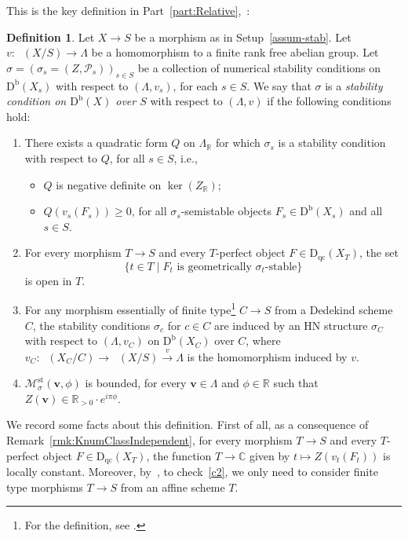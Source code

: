 \documentclass[11pt, reqno]{amsart}
\numberwithin{equation}{section}
\theoremstyle{plain}
\theoremstyle{remark}
\theoremstyle{definition}
\newtheorem{definition}[theorem]{Definition}
\theoremstyle{italicsname}
\newcommand{\st}{\mid}
\newcommand{\bv}{\mathbf{v}}
\newcommand{\Db}{\mathrm{D^b}}
\newcommand{\Dqc}{\mathrm{D}_{\mathrm{qc}}}
\newcommand{\num}{\mathrm{num}}
\DeclareMathOperator{\Knum}{\rK_{\num}}
\newcommand{\cM}{\mathcal{M}}
\newcommand{\cP}{\mathscr{P}}
\newcommand{\rK}{\mathrm{K}}
\def\CC{\ensuremath{\mathbb{C}}}
\def\RR{\ensuremath{\mathbb{R}}}
\begin{document}
This is the key definition in Part~\ref{part:Relative},~\cite[Definition 21.15]{stability-families}:

\begin{definition}\label{def:FamilyStabilityConditions}
Let $X\to S$ be a morphism as in Setup~\ref{assum-stab}. 
Let $v\colon\Knum(X/S)\to\Lambda$ be a homomorphism to a finite rank free abelian group. 
Let ${\sigma}=(\sigma_s=(Z,\cP_s))_{s\in S}$ be a collection of numerical stability conditions on $\Db(X_s)$ with respect to $(\Lambda,v_s)$, for each $s\in S$. 
We say that ${\sigma}$ is a \emph{stability condition on $\Db(X)$ over $S$} with respect to $(\Lambda,v)$ if the following conditions hold:
\begin{enumerate}[{\rm (i)}]
\item\label{c1} There exists a quadratic form $Q$ on $\Lambda_\RR$ for which $\sigma_s$ is a stability condition with respect to $Q$, for all $s\in S$, i.e.,
\begin{itemize}
    \item $Q$ is negative definite on $\ker(Z_\RR)$;
    \item $Q(v_s(F_s))\geq0$, for all $\sigma_s$-semistable objects $F_s\in\Db(X_s)$ and all $s\in S$.
\end{itemize}
\item\label{c2} For every morphism $T\to S$ and every $T$-perfect object $F\in \Dqc(X_T)$, the set 
\[
\{t\in T \st F_t \text{ is geometrically }\sigma_t\text{-stable}\}
\]
is open in $T$.
\item\label{c3} For any morphism essentially of finite type\footnote{For the definition, see \cite[Definition 11.16]{stability-families}.}  $C\to S$ from a Dedekind scheme $C$, the stability conditions $\sigma_c$ for $c \in C$ are  induced by an HN structure $\sigma_C$ with respect to $(\Lambda,v_C)$ on $\Db(X_C)$ over $C$, where $v_C \colon\Knum(X_C/C)\to\Knum(X/S)\xrightarrow{v}\Lambda$ is the homomorphism induced by $v$. 
\item\label{c4} $\cM^{\mathrm{st}}_{{\sigma}}(\bv,\phi)$ is bounded, for every $\bv\in \Lambda$ and $\phi\in \RR$ such that $Z(\bv)\in\RR_{>0}\cdot e^{i\pi\phi}$.
\end{enumerate}
\end{definition}

We record some facts about this definition. 
First of all, as a consequence of Remark~\ref{rmk:KnumClassIndependent}, for every morphism $T\to S$ and every $T$-perfect object $F\in\Dqc(X_T)$, the function $T\to\CC$ given by $t\mapsto Z(v_t(F_t))$ is locally constant.
Moreover, by~\cite[Lemma 20.3]{stability-families}, to check~\ref{c2}, we only need to consider finite type morphisms $T\to S$ from an affine scheme $T$.
\end{document}
